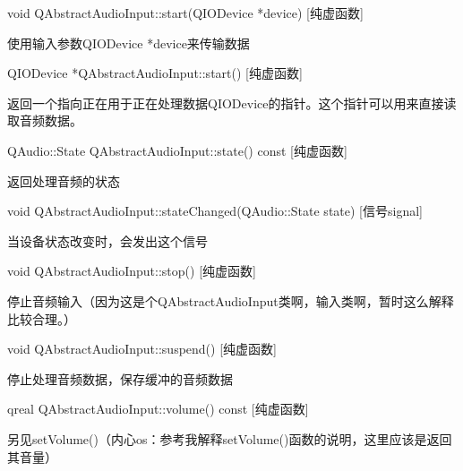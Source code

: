 void QAbstractAudioInput::start(QIODevice *device) [纯虚函数]

使用输入参数QIODevice *device来传输数据

QIODevice *QAbstractAudioInput::start() [纯虚函数]

返回一个指向正在用于正在处理数据QIODevice的指针。这个指针可以用来直接读取音频数据。

QAudio::State QAbstractAudioInput::state() const [纯虚函数]

返回处理音频的状态

void QAbstractAudioInput::stateChanged(QAudio::State state) [信号signal]

当设备状态改变时，会发出这个信号

void QAbstractAudioInput::stop() [纯虚函数]

停止音频输入（因为这是个QAbstractAudioInput类啊，输入类啊，暂时这么解释比较合理。）

void QAbstractAudioInput::suspend() [纯虚函数]

停止处理音频数据，保存缓冲的音频数据

qreal QAbstractAudioInput::volume() const [纯虚函数]

另见setVolume()（内心os：参考我解释setVolume()函数的说明，这里应该是返回其音量）

